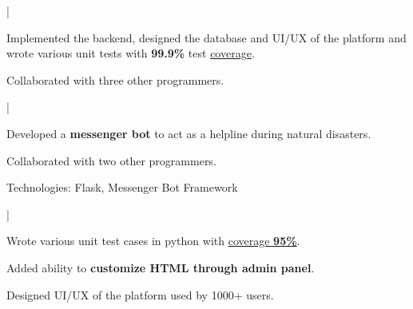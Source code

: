 \documentclass[a4paper]{deedy-resume-openfont}
\begin{document}
\begin{minipage}[t]{0.63\textwidth}
 | 
\begin{tightemize}
\item Implemented the backend, designed the database and UI/UX of the platform and wrote various unit tests with \textbf{99.9\%} test \href{https://coveralls.io/github/hirenchalodiya1/agrisync}{coverage}.
\item Collaborated with three other programmers.
\end{tightemize}
\sectionsep

 | 
\begin{tightemize}
\item Developed a \textbf{messenger bot} to act as a helpline during natural disasters.
\item Collaborated with two other programmers.
\item Technologies: Flask, Messenger Bot Framework
\end{tightemize}
\sectionsep

 | 
\begin{tightemize}
\item Wrote various unit test cases in python with \href{https://coveralls.io/github/hirenchalodiya1/gymkhana_portal}{coverage \textbf{95\%}}.
\item Added ability to \textbf{customize HTML through admin panel}.
\item Designed UI/UX of the platform used by 1000+ users.
\end{tightemize}
\sectionsep


\end{minipage}
\end{document}
